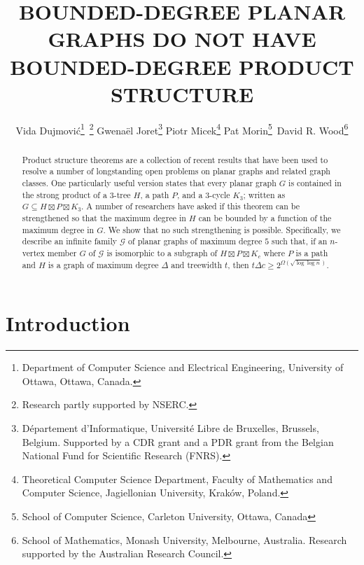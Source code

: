 \documentclass{patmorin}
\title{\MakeUppercase{Bounded-Degree Planar Graphs Do Not Have Bounded-Degree Product Structure}}
\author{%
  Vida Dujmović\thanks{Department of Computer Science and Electrical Engineering, University of Ottawa, Ottawa, Canada.}\, \thanks{Research partly supported by NSERC.} \quad
  Gwenaël Joret\thanks{D\'epartement d'Informatique, Universit\'e Libre de Bruxelles, Brussels, Belgium.
  Supported by a CDR grant and a PDR grant from the Belgian National Fund for Scientific Research (FNRS).} \quad
  Piotr Micek\thanks{Theoretical Computer Science Department, Faculty of Mathematics and Computer Science, Jagiellonian University, Krak\'ow, Poland.}\quad
  Pat Morin\thanks{School of Computer Science, Carleton University, Ottawa, Canada}\, \footnotemark[2] \quad
  David R. Wood\thanks{School of Mathematics, Monash University, Melbourne, Australia.
  Research supported by the Australian Research Council.}
}
\date{}
\newcommand\subsetcong{\mathrel{\text{%
    \setbox0\hbox{$\subseteq$}%
    \rlap{\hbox to \wd0{\hss\hss\hss\raisebox{1.5\height}{$\sim$}\hss}}\box0
}}}
\renewcommand{\subsetcong}{\subseteq}
\renewcommand{\ge}{\geqslant}
\begin{document}
\maketitle


\begin{abstract}
   Product structure theorems are a collection of recent results that have been used to resolve a number of longstanding open problems on planar graphs and related graph classes.  One particularly useful version states that every planar graph $G$ is contained in the strong product of a $3$-tree $H$, a path $P$, and a $3$-cycle $K_3$; written as $G\subsetcong H\boxtimes P\boxtimes K_3$.  A number of researchers have asked if this theorem can be strengthened so that the maximum degree in $H$ can be bounded by a function of the maximum degree in $G$.  We show that no such strengthening is possible.  Specifically, we describe an infinite family $\mathcal{G}$ of planar graphs of maximum degree $5$ such that, if an $n$-vertex member $G$ of $\mathcal{G}$ is isomorphic to a subgraph of $H\boxtimes P\boxtimes K_c$ where $P$ is a path and $H$ is a graph of maximum degree $\Delta$ and treewidth $t$, then $t\Delta c \ge 2^{\Omega(\sqrt{\log\log n})}$.
\end{abstract}

\section{Introduction}
\end{document}
